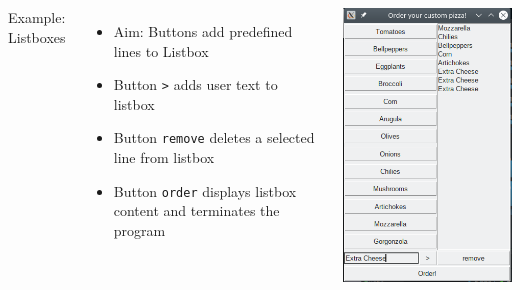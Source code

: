\begin{frame}[fragile]
%
\begin{columns}[T]
\begin{Large}
	{Example: Listboxes}
	\vspace{12pt}
\end{Large}
%
\begin{itemize}
\item Aim: Buttons add predefined lines to Listbox
\item Button \texttt{>} adds user text to listbox
\item Button \texttt{remove} deletes a selected line from listbox
\item Button \texttt{order} displays listbox content and terminates the program
\end{itemize}
%
\begin{tcolorbox}[title=Pizza Order Tool]
\begin{center}
	\includegraphics[width=.5\linewidth]{./gfx/tk-listbox}
\end{center}
\end{tcolorbox}
\end{columns}
%
\end{frame}


